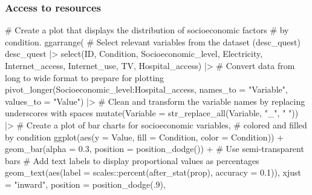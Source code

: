 \documentclass[
  bookmarksnumbered]{article}
\newenvironment{Shaded}{\begin{snugshade}}{\end{snugshade}}
\newcommand{\AttributeTok}[1]{\textcolor[rgb]{0.80,0.80,0.80}{#1}}
\newcommand{\CommentTok}[1]{\textcolor[rgb]{0.50,0.62,0.50}{#1}}
\newcommand{\DecValTok}[1]{\textcolor[rgb]{0.86,0.86,0.80}{#1}}
\newcommand{\FloatTok}[1]{\textcolor[rgb]{0.75,0.75,0.82}{#1}}
\newcommand{\FunctionTok}[1]{\textcolor[rgb]{0.94,0.94,0.56}{#1}}
\newcommand{\NormalTok}[1]{\textcolor[rgb]{0.80,0.80,0.80}{#1}}
\newcommand{\SpecialCharTok}[1]{\textcolor[rgb]{0.86,0.64,0.64}{#1}}
\newcommand{\StringTok}[1]{\textcolor[rgb]{0.80,0.58,0.58}{#1}}
\begin{document}
\subsubsection{Access to resources}\label{access-to-resources}

\begin{Shaded}
\begin{Highlighting}[]
\CommentTok{\# Create a plot that displays the distribution of socioeconomic factors}
\CommentTok{\# by condition.}
\FunctionTok{ggarrange}\NormalTok{(}
  \CommentTok{\# Select relevant variables from the dataset (desc\_quest)}
\NormalTok{  desc\_quest }\SpecialCharTok{|\textgreater{}} 
  \FunctionTok{select}\NormalTok{(ID, Condition,}
\NormalTok{         Socioeconomic\_level, Electricity, Internet\_access, Internet\_use,}
\NormalTok{         TV, Hospital\_access) }\SpecialCharTok{|\textgreater{}}
  \CommentTok{\# Convert data from long to wide format to prepare for plotting}
  \FunctionTok{pivot\_longer}\NormalTok{(Socioeconomic\_level}\SpecialCharTok{:}\NormalTok{Hospital\_access,}
                \AttributeTok{names\_to =} \StringTok{"Variable"}\NormalTok{,}
                \AttributeTok{values\_to =} \StringTok{"Value"}\NormalTok{) }\SpecialCharTok{|\textgreater{}} 
  \CommentTok{\# Clean and transform the variable names by replacing underscores with spaces}
  \FunctionTok{mutate}\NormalTok{(}\AttributeTok{Variable =} \FunctionTok{str\_replace\_all}\NormalTok{(Variable, }\StringTok{"\_"}\NormalTok{, }\StringTok{" "}\NormalTok{)) }\SpecialCharTok{|\textgreater{}}
  \CommentTok{\# Create a plot of bar charts for socioeconomic variables, }
  \CommentTok{\# colored and filled by condition}
  \FunctionTok{ggplot}\NormalTok{(}\FunctionTok{aes}\NormalTok{(}\AttributeTok{y =}\NormalTok{ Value, }\AttributeTok{fill =}\NormalTok{ Condition, }\AttributeTok{color =}\NormalTok{ Condition)) }\SpecialCharTok{+}
  \FunctionTok{geom\_bar}\NormalTok{(}\AttributeTok{alpha =} \FloatTok{0.3}\NormalTok{, }\AttributeTok{position =} \FunctionTok{position\_dodge}\NormalTok{()) }\SpecialCharTok{+}  \CommentTok{\# Use semi{-}transparent bars}
  \CommentTok{\# Add text labels to display proportional values as percentages}
  \FunctionTok{geom\_text}\NormalTok{(}\FunctionTok{aes}\NormalTok{(}\AttributeTok{label =}\NormalTok{ scales}\SpecialCharTok{::}\FunctionTok{percent}\NormalTok{(}\FunctionTok{after\_stat}\NormalTok{(prop), }\AttributeTok{accuracy =} \FloatTok{0.1}\NormalTok{)),}
               \AttributeTok{xjust =} \StringTok{"inward"}\NormalTok{,}
               \AttributeTok{position =} \FunctionTok{position\_dodge}\NormalTok{(.}\DecValTok{9}\NormalTok{),}

\end{Highlighting}
\end{Shaded}
\end{document}

